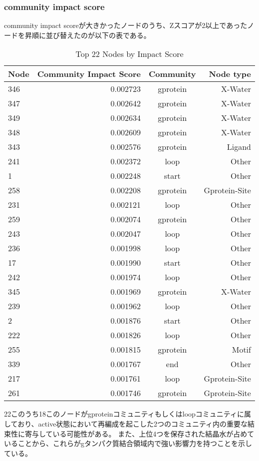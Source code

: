 \subsubsection{community impact score}
community impact scoreが大きかったノードのうち、Zスコアが2以上であったノードを昇順に並び替えたのが以下の表である。
\begin{table}[ht]
    \centering
    \begin{tabular}{|l|r|c|r|}
    \hline
    \textbf{Node} & \textbf{Community Impact Score} & \textbf{Community} & \textbf{Node type}\\
    \hline
    346 & 0.002723 & gprotein & X-Water \\
    347 & 0.002642 & gprotein & X-Water \\
    349 & 0.002634 & gprotein & X-Water \\
    348 & 0.002609 & gprotein & X-Water \\
    343 & 0.002576 & gprotein & Ligand \\
    241 & 0.002372 & loop & Other \\
    1 & 0.002248 & start & Other \\
    258 & 0.002208 & gprotein & Gprotein-Site \\
    231 & 0.002121 & loop & Other \\
    259 & 0.002074 & gprotein & Other \\
    243 & 0.002047 & loop & Other \\
    236 & 0.001998 & loop & Other \\
    17 & 0.001990 & start & Other \\
    242 & 0.001974 & loop & Other \\
    345 & 0.001969 & gprotein & X-Water\\
    239 & 0.001962 & loop & Other \\
    2 & 0.001876 & start & Other \\
    222 & 0.001826 & loop & Other \\
    255 & 0.001815 &  gprotein & Motif \\
    339 & 0.001767 & end & Other \\
    217 & 0.001761 & loop & Gprotein-Site \\
    261 & 0.001746 & gprotein & Gprotein-Site \\
    \hline
    \end{tabular}
    \caption{Top 22 Nodes by Impact Score}
\end{table}
    
22このうち18このノードがgproteinコミュニティもしくはloopコミュニティに属しており、active状態において再編成を起こした2つのコミュニティ内の重要な結束性に寄与している可能性がある。
また、上位4つを保存された結晶水が占めていることから、これらがgタンパク質結合領域内で強い影響力を持つことを示している。


